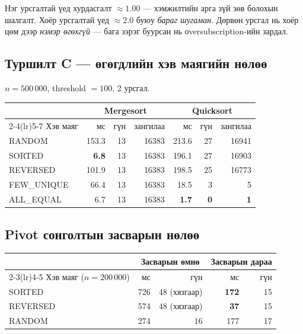 \documentclass[11pt,a4paper]{article}
\begin{document}
Нэг урсгалтай үед хурдасгалт $\approx 1.00$ --- хэмжилтийн арга зүй зөв
болохын шалгалт. Хоёр урсгалтай үед $\approx 2.0$ буюу \emph{бараг шугаман}.
Дөрвөн урсгал нь хоёр цөм дээр \emph{нэмэр өгөхгүй} --- бага зэрэг буурсан нь
оversubscription-ийн зардал.

\subsection{Туршилт C --- өгөгдлийн хэв маягийн нөлөө}
$n = 500\,000$, threshold $= 100$, 2 урсгал.

\begin{center}
\small
\begin{tabular}{lrrrrrr}
\toprule
& \multicolumn{3}{c}{\textbf{Mergesort}} & \multicolumn{3}{c}{\textbf{Quicksort}} \\
\cmidrule(lr){2-4}\cmidrule(lr){5-7}
Хэв маяг & мс & гүн & зангилаа & мс & гүн & зангилаа \\
\midrule
RANDOM     & 153.3 & 13 & 16383 & 213.6 & 27 & 16941 \\
SORTED     & \textbf{6.8}   & 13 & 16383 & 196.1 & 27 & 16903 \\
REVERSED   & 101.9 & 13 & 16383 & 198.5 & 25 & 16773 \\
FEW\_UNIQUE & 66.4  & 13 & 16383 & 18.5  & 3  & 5 \\
ALL\_EQUAL  & 6.7   & 13 & 16383 & \textbf{1.7}   & \textbf{0}  & \textbf{1} \\
\bottomrule
\end{tabular}
\label{tab:pattern}
\end{center}

\subsection{Pivot сонголтын засварын нөлөө}
\begin{center}
\small
\begin{tabular}{lrrrr}
\toprule
& \multicolumn{2}{c}{\textbf{Засварын өмнө}} & \multicolumn{2}{c}{\textbf{Засварын дараа}} \\
\cmidrule(lr){2-3}\cmidrule(lr){4-5}
Хэв маяг ($n=200\,000$) & мс & гүн & мс & гүн \\
\midrule
SORTED   & 726 & 48 (хязгаар) & \textbf{172} & 15 \\
REVERSED & 574 & 48 (хязгаар) & \textbf{37}  & 15 \\
RANDOM   & 274 & 16 & 177 & 17 \\
\bottomrule
\end{tabular}
\end{center}
\newpage
\end{document}

